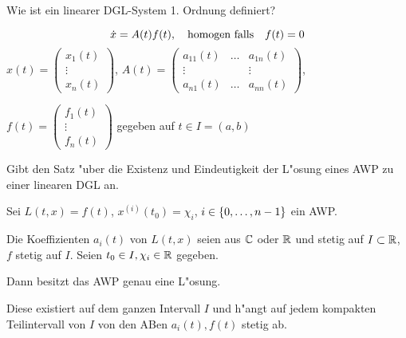 \documentclass[9pt]{article}
\newcommand{\R}[1]{%
	\ifthenelse{\equal{#1}{}}
		{\mathbb{R}}
		{\mathbb{R}^{#1}}}%
\newcommand{\C}[1]{%
	\ifthenelse{\equal{#1}{}}
	{\mathbb{C}}
	{\mathbb{C}^{#1}}}%
\newenvironment{field}{}{\newpage}
\newif\ifnote
\newenvironment{note}{\notetrue}{\notefalse}
\newcommand{\localtag}{}
\newcommand{\globaltag}{}
\newcommand{\uuid}{}
\newcommand{\tags}[1]{
    \ifnote 
        \renewcommand{\localtag}{#1}
    \else
        \renewcommand{\globaltag}{#1}
    \fi 
    }
\newcommand{\xplain}[1]{\renewcommand{\uuid}{#1}}
\begin{document}
\begin{note}
	\xplain{UUID}
	\tags{definition, satz LDGL, 3.7}
	
	\begin{field}  %
		Wie ist ein linearer DGL-System 1. Ordnung definiert?
	\end{field}
	
	\begin{field}  %
		\begin{equation*}
		\dot{x} = A(t) f(t), \qq{homogen falls} f(t) =0
		\end{equation*}
		\footnotesize
		$x(t) = \begin{pmatrix}x_1(t) \\ \vdots \\ x_n(t) \end{pmatrix}$, \quad $A(t)=
			\begin{pmatrix}
				a_{11}(t) & \dots & a_{1n}(t) \\
				\vdots    &       & \vdots \\
				a_{n1}(t) & \dots & a_{nn}(t) 
			\end{pmatrix}$,
		
		
		$f(t) = 
			\begin{pmatrix}
				f_1(t) \\ \vdots \\ f_n(t)
			\end{pmatrix}$
		gegeben auf $t\in I = (a,b)$
	\end{field}
		
	\begin{field}  %
		Gibt den Satz "uber die
		Existenz und Eindeutigkeit der L"osung eines AWP zu einer linearen DGL an.
	\end{field}
	
	\begin{field}  %
		Sei $L(t,x)=f(t)$, $x^{(i)}(t_0) = \chi_i$, $i \in \qty{0,\dots, n-1}$ ein AWP.
		
		Die Koeffizienten $a_i(t)$ von $L(t,x)$ seien aus $\C{}$ oder $\R{}$ und stetig auf $I \subset \R{}$, $f$ stetig auf $I$. Seien $t_0\in I, \chi_i \in \R{}$  gegeben.
		
		 Dann besitzt das AWP genau eine L"osung.
		 
		 Diese existiert auf dem ganzen Intervall $I$ und h"angt auf jedem kompakten Teilintervall von $I$ von den ABen $a_i(t),f(t)$ stetig ab.
	\end{field}
\end{note}
\end{document}

